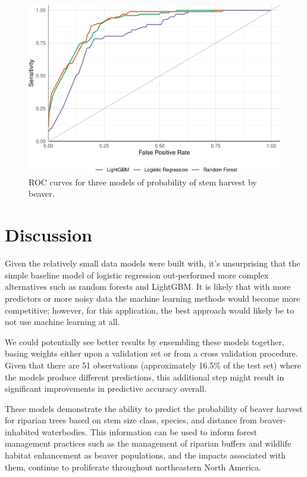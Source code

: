 \documentclass[]{elsarticle} %
\begin{document}
\begin{figure}
\includegraphics[width=1\linewidth]{project_example_files/figure-latex/roc-1} \caption{ROC curves for three models of probability of stem harvest by beaver.}\label{fig:roc}
\end{figure}

\hypertarget{discussion}{%
\section{Discussion}\label{discussion}}

Given the relatively small data models were built with, it's unsurprising that
the simple baseline model of logistic regression out-performed more complex
alternatives such as random forests and LightGBM. It is likely that with more
predictors or more noisy data the machine learning methods would become more
competitive; however, for this application, the best approach would likely be to
not use machine learning at all.

We could potentially see better results by ensembling these models together,
basing weights either upon a validation set or from a cross validation
procedure. Given that there are 51 observations (approximately 16.5\% of the test
set) where the models produce different predictions, this additional step might
result in significant improvements in predictive accuracy overall.

These models demonstrate the ability to predict the probability of beaver
harvest for riparian trees based on stem size class, species, and distance from
beaver-inhabited waterbodies. This information can be used to inform forest
management practices such as the management of riparian buffers and wildlife
habitat enhancement as beaver populations, and the impacts associated with them,
continue to proliferate throughout northeastern North America.
\end{document}
